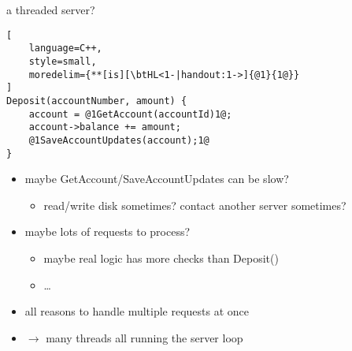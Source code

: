 \begin{frame}[fragile,label=threadedServerWhy]{a threaded server?}
\begin{lstlisting}[
    language=C++,
    style=small,
    moredelim={**[is][\btHL<1-|handout:1->]{@1}{1@}}
]
Deposit(accountNumber, amount) {
    account = @1GetAccount(accountId)1@;
    account->balance += amount;
    @1SaveAccountUpdates(account);1@
}
\end{lstlisting}
\begin{itemize}
\item maybe GetAccount/SaveAccountUpdates can be slow?
    \begin{itemize}
    \item read/write disk sometimes? contact another server sometimes?
    \end{itemize}
\item maybe lots of requests to process?
    \begin{itemize}
    \item maybe real logic has more checks than Deposit()
    \item \ldots
    \end{itemize}
\item all reasons to handle multiple requests at once
\item $\rightarrow$ many threads all running the server loop
\end{itemize}
\end{frame}
